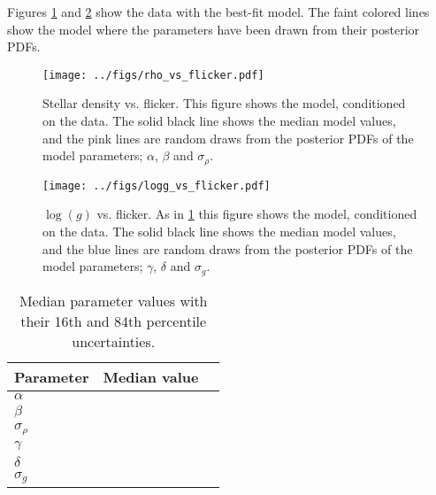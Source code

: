 Figures \ref{fig:rhostar} and \ref{fig:logg} show the data with the best-fit
model.
The faint colored lines show the model where the parameters have been drawn
from their posterior PDFs.

\begin{figure}
\begin{center}
\texttt{[image: ../figs/rho\_vs\_flicker.pdf]}
\caption{
Stellar density vs. flicker. This figure shows the model, conditioned on the
data. The solid black line shows the median model values, and the pink lines
are random draws from the posterior PDFs of the model parameters; $\alpha$,
$\beta$ and $\sigma_{\rho}$.
}
\label{fig:rhostar}
\end{center}
\end{figure}

\begin{figure}
\begin{center}
\texttt{[image: ../figs/logg\_vs\_flicker.pdf]}
\caption{
$\log(g)$ vs. flicker. As in \ref{fig:rhostar} this figure shows
the model, conditioned on the data. The solid black line shows the median model
values, and the blue lines are random draws from the posterior PDFs of the
model parameters; $\gamma$, $\delta$ and $\sigma_g$.
}
\label{fig:logg}
\end{center}
\end{figure}

\begin{table}
\caption{Median parameter values with their 16th and 84th percentile
	 uncertainties.}
\begin{tabular}{lcc}
\hline\hline
    Parameter & Median value \\
    \hline
    $\alpha$         &   \\
    $\beta$          &   \\
    $\sigma_{\rho}$  &   \\
    $\gamma$         &   \\
    $\delta$         &   \\
    $\sigma_{g}$     &   \\
    \hline
\end{tabular}
\end{table}


